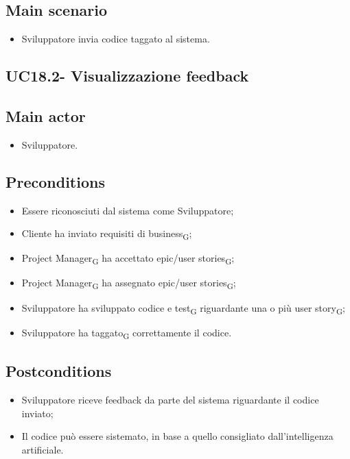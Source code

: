\documentclass{article}
\begin{document}
    \subsection*{Main scenario}
        \begin{itemize}
            \item Sviluppatore invia codice taggato al sistema.
        \end{itemize}
        
    \subsection{UC18.2- Visualizzazione feedback}
    \subsection*{Main actor}
        \begin{itemize}
            \item Sviluppatore.
        \end{itemize}
        
    \subsection*{Preconditions}
        \begin{itemize}
            \item Essere riconosciuti dal sistema come Sviluppatore;
            \item Cliente ha inviato requisiti di business\textsubscript{G};
            \item Project Manager\textsubscript{G} ha accettato epic/user stories\textsubscript{G};
            \item Project Manager\textsubscript{G} ha assegnato epic/user stories\textsubscript{G};
            \item Sviluppatore ha sviluppato codice e test\textsubscript{G} riguardante una o più user story\textsubscript{G};
            \item Sviluppatore ha taggato\textsubscript{G} correttamente il codice.
        \end{itemize}
        
    \subsection*{Postconditions}
        \begin{itemize}
            \item Sviluppatore riceve feedback da parte del sistema riguardante il codice inviato;
            \item Il codice può essere sistemato, in base a quello consigliato dall'intelligenza artificiale.
        \end{itemize}
\end{document}
